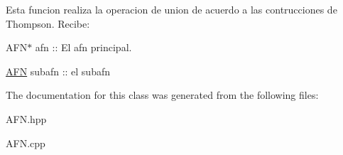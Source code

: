 Esta funcion realiza la operacion de union de acuerdo a las contrucciones de Thompson. Recibe\+:
\begin{DoxyItemize}
\item A\+F\+N$\ast$ afn \+:\+: El afn principal.
\item \hyperlink{class_a_f_n}{A\+FN} subafn \+:\+: el subafn 
\end{DoxyItemize}

The documentation for this class was generated from the following files\+:\begin{DoxyCompactItemize}
\item 
A\+F\+N.\+hpp\item 
A\+F\+N.\+cpp\end{DoxyCompactItemize}
